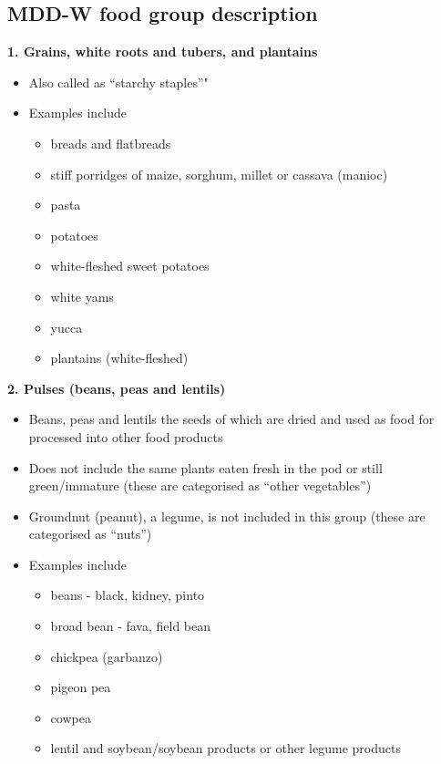 \documentclass[12pt,]{book}
\providecommand{\tightlist}{%
  \setlength{\itemsep}{0pt}\setlength{\parskip}{0pt}}
\theoremstyle{definition}
\theoremstyle{definition}
\theoremstyle{definition}
\theoremstyle{remark}
\begin{document}
\hypertarget{mdd-w-food-group-description}{%
\subsection{MDD-W food group
description}\label{mdd-w-food-group-description}}

\textbf{1. Grains, white roots and tubers, and plantains}

\begin{itemize}
\tightlist
\item
  Also called as ``starchy staples''"
\item
  Examples include

  \begin{itemize}
  \tightlist
  \item
    breads and flatbreads
  \item
    stiff porridges of maize, sorghum, millet or cassava (manioc)
  \item
    pasta
  \item
    potatoes
  \item
    white-fleshed sweet potatoes
  \item
    white yams
  \item
    yucca
  \item
    plantains (white-fleshed)
  \end{itemize}
\end{itemize}

\textbf{2. Pulses (beans, peas and lentils)}

\begin{itemize}
\tightlist
\item
  Beans, peas and lentils the seeds of which are dried and used as food
  for processed into other food products
\item
  Does not include the same plants eaten fresh in the pod or still
  green/immature (these are categorised as ``other vegetables'')
\item
  Groundnut (peanut), a legume, is not included in this group (these are
  categorised as ``nuts'')
\item
  Examples include

  \begin{itemize}
  \tightlist
  \item
    beans - black, kidney, pinto
  \item
    broad bean - fava, field bean
  \item
    chickpea (garbanzo)
  \item
    pigeon pea
  \item
    cowpea
  \item
    lentil and soybean/soybean products or other legume products
  \end{itemize}
\end{itemize}
\end{document}
